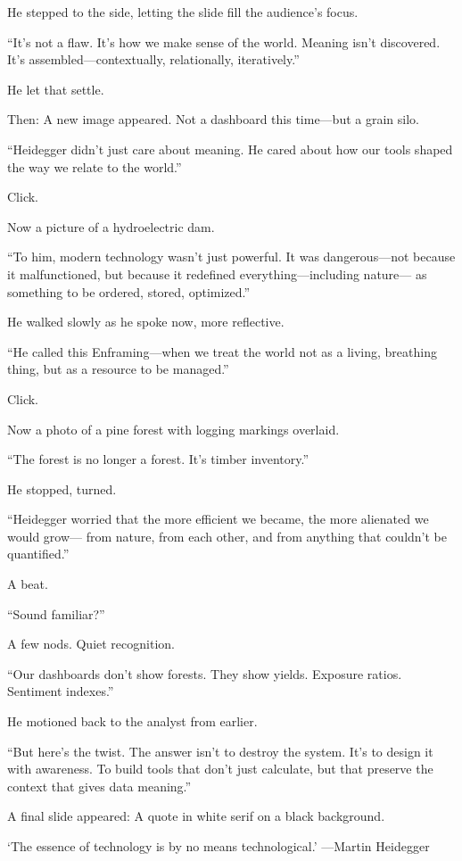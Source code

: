 He stepped to the side, letting the slide fill the audience’s focus.

“It’s not a flaw. It’s how we make sense of the world.
Meaning isn’t discovered.
It’s assembled—contextually, relationally, iteratively.”

He let that settle.

Then:
A new image appeared. Not a dashboard this time—but a grain silo.

“Heidegger didn’t just care about meaning.
He cared about how our tools shaped the way we relate to the world.”

Click.

Now a picture of a hydroelectric dam.

“To him, modern technology wasn’t just powerful.
It was dangerous—not because it malfunctioned,
but because it redefined everything—including nature—
as something to be ordered, stored, optimized.”

He walked slowly as he spoke now, more reflective.

“He called this Enframing—when we treat the world
not as a living, breathing thing,
but as a resource to be managed.”

Click.

Now a photo of a pine forest with logging markings overlaid.

“The forest is no longer a forest.
It’s timber inventory.”

He stopped, turned.

“Heidegger worried that the more efficient we became,
the more alienated we would grow—
from nature, from each other,
and from anything that couldn’t be quantified.”

A beat.

“Sound familiar?”

A few nods. Quiet recognition.

“Our dashboards don’t show forests.
They show yields.
Exposure ratios.
Sentiment indexes.”

He motioned back to the analyst from earlier.

“But here’s the twist.
The answer isn’t to destroy the system.
It’s to design it with awareness.
To build tools that don’t just calculate,
but that preserve the context that gives data meaning.”

A final slide appeared:
A quote in white serif on a black background.

‘The essence of technology is by no means technological.’
—Martin Heidegger

